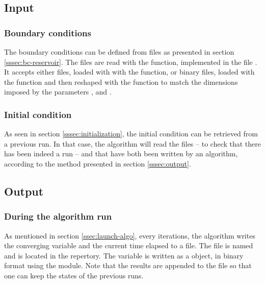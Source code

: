     \subsection{Input\label{sssec:input}}
    \noindent

        \subsubsection{Boundary conditions}
        \noindent

            The boundary conditions can be defined from files as presented in section \ref{sssec:bc-reservoir}. The files
            are read with the  function, implemented in the file .
            It accepts either  files, loaded with with the  function, or
            binary files, loaded with the  function and then reshaped with the
             function to match the dimensions imposed by the parameters
            ,  and .\\

        \subsubsection{Initial condition}
        \noindent

            As seen in section \ref{sssec:initialization}, the initial condition can be retrieved from a previous run.
            In that case, the algorithm will read the files  -- to check that there has been indeed
            a run -- and  that have both been written by an algorithm, according to the method
            presented in section \ref{sssec:output}.

    \subsection{Output\label{sssec:output}}
    \noindent

        \subsubsection{During the algorithm run}
        \noindent

            As mentioned in section \ref{ssec:launch-algo}, every  iterations, the algorithm writes
            the converging variable and the current time elapsed to a file.
            The file is named  and is located in the  repertory.
            The variable is written as a  object, in binary format using the \cpck{} module.
            Note that the results are appended to the file  so that one can keep the
            states of the previous runs.

